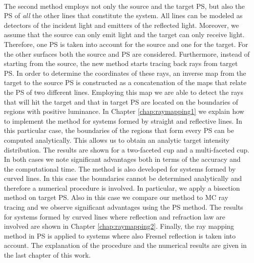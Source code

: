 \\ \indent The second method employs not only the source and the target PS, but also the PS of \textit{all} the other lines that constitute the system.
All lines can be modeled as detectors of the incident light and emitters of the reflected light.
Moreover, we assume that the source can only emit light and the target can only receive light.
Therefore, one PS is taken into account for the source and one for the target. For the other surfaces both the source and PS are considered.
Furthermore, instead of starting from the source, the new method starts tracing back rays from target PS. 
In order to determine the coordinates of these rays, an inverse map from the target to the source PS is constructed as a concatenation of the maps that relate the PS of two different lines.
Employing this map we are able to detect the rays that will hit the target and that in target PS are located on the boundaries of regions with positive luminance. 
In Chapter \ref{chap:raymapping1} we explain how to implement the method for systems formed by straight and reflective lines. In this particular case, the boundaries of the regions that form every PS can be computed analytically. This allows us to obtain an analytic target intensity distribution. The results are shown for a two-faceted cup and a multi-faceted cup. In both cases we note significant advantages both in terms of the accuracy and the computational time. The method is also developed for systems formed by curved lines. In this case the boundaries cannot be determined analytically and therefore a numerical procedure is involved. In particular, we apply a bisection method on target PS. Also in this case we compare our method to MC ray tracing and we observe significant advantages using the PS method. The results for systems formed by curved lines where reflection and refraction law are involved are shown in Chapter \ref{chap:raymapping2}. Finally, the ray mapping method in PS is applied to systems where also Fresnel reflection is taken into account. The explanation of the procedure and the numerical results are given in the last chapter of this work.